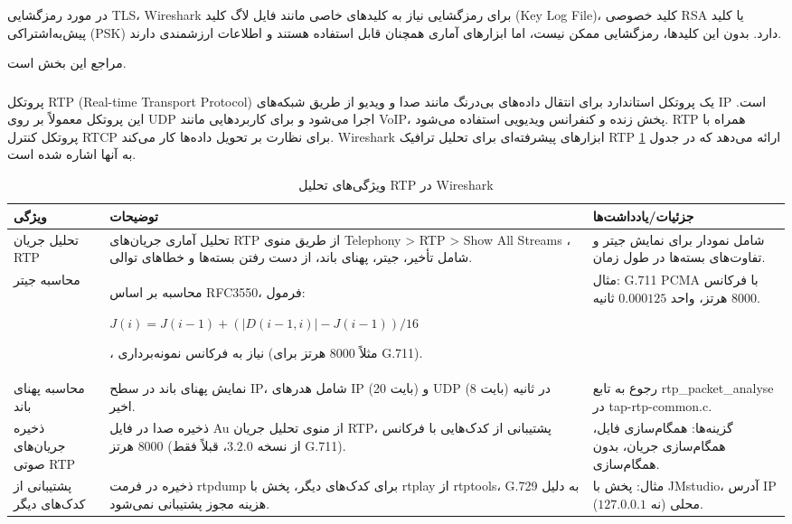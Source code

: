 \documentclass[12pt]{article}
\begin{document}
	 در مورد رمزگشایی \textenglish{TLS}، Wireshark برای رمزگشایی نیاز به کلیدهای خاصی مانند فایل لاگ کلید (\textenglish{Key Log File})، کلید خصوصی RSA یا کلید پیش‌به‌اشتراکی (PSK) دارد. بدون این کلیدها، رمزگشایی ممکن نیست، اما ابزارهای آماری همچنان قابل استفاده هستند و اطلاعات ارزشمندی دارند.
	 
	 مراجع این بخش \cite{a1, a2} است.
	\subsubsection{}
	پروتکل \textenglish{RTP (Real-time Transport Protocol)} یک پروتکل استاندارد برای انتقال داده‌های بی‌درنگ مانند صدا و ویدیو از طریق شبکه‌های IP است. این پروتکل معمولاً بر روی UDP اجرا می‌شود و برای کاربردهایی مانند VoIP، پخش زنده و کنفرانس ویدیویی استفاده می‌شود. RTP همراه با پروتکل کنترل RTCP برای نظارت بر تحویل داده‌ها کار می‌کند.
	Wireshark
	 ابزارهای پیشرفته‌ای برای تحلیل ترافیک RTP ارائه می‌دهد که در جدول \ref{wire:2} به آنها اشاره شده است.
	 \begin{table}[h]
	 	\centering
	 	\begin{tabular}{|p{3cm}|p{5cm}|p{5cm}|}
	 		\hline
	 		ویژگی & توضیحات & جزئیات/یادداشت‌ها \\
	 		\hline
	 		تحلیل جریان RTP & تحلیل آماری جریان‌های RTP از طریق منوی
	 		 \textenglish{Telephony > RTP > Show All Streams}
	 		 ، شامل تأخیر، جیتر، پهنای باند، از دست رفتن بسته‌ها و خطاهای توالی. & شامل نمودار برای نمایش جیتر و تفاوت‌های بسته‌ها در طول زمان. \\
	 		\hline
	 		محاسبه جیتر & محاسبه بر اساس RFC3550، فرمول:
	 		
	 		 $J(i) = J(i-1) + (|D(i-1,i)| - J(i-1))/16$
	 		 
	 		 ، نیاز به فرکانس نمونه‌برداری (مثلاً 8000 هرتز برای \textenglish{G.711}). & مثال: G.711 PCMA با فرکانس 8000 هرتز، واحد $0.000125$ ثانیه. \\
	 		\hline
	 		محاسبه پهنای باند & نمایش پهنای باند در سطح IP، شامل هدرهای IP (20 بایت) و UDP (8 بایت) در ثانیه اخیر. & رجوع به تابع rtp\_packet\_analyse در tap-rtp-common.c. \\
	 		\hline
	 		ذخیره جریان‌های صوتی RTP & ذخیره صدا در فایل Au از منوی تحلیل جریان RTP، پشتیبانی از کدک‌هایی با فرکانس 8000 هرتز (از نسخه $3.2.0$، قبلاً فقط \textenglish{G.711}). & گزینه‌ها: همگام‌سازی فایل، همگام‌سازی جریان، بدون همگام‌سازی. \\
	 		\hline
	 		پشتیبانی از کدک‌های دیگر & ذخیره در فرمت rtpdump برای کدک‌های دیگر، پخش با rtplay از rtptools، G.729 به دلیل هزینه مجوز پشتیبانی نمی‌شود. & مثال: پخش با JMstudio، آدرس IP محلی (نه $127.0.0.1$). \\
	 		\hline
	 	\end{tabular}
	 	\caption{ویژگی‌های تحلیل RTP در Wireshark}
	 	\label{wire:2}
	 \end{table}
	 
\end{document}
